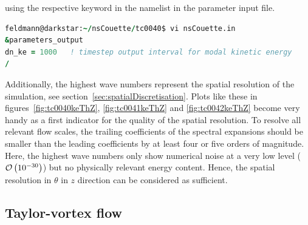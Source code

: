 \documentclass[a4paper, 11pt, DIV=11]{scrartcl}
\begin{document}
using the respective keyword in the namelist  in the parameter input file.
\begin{lstlisting}[language=fortran]
feldmann@darkstar:~/nsCouette/tc0040$ vi nsCouette.in
&parameters_output
dn_ke = 1000   ! timestep output interval for modal kinetic energy
/
\end{lstlisting}
Additionally, the highest wave numbers represent the spatial resolution
of the simulation, see section~\ref{sec:spatialDiscretisation}. Plots
like these in figures~\ref{fig:tc0040keThZ}, \ref{fig:tc0041keThZ} and
\ref{fig:tc0042keThZ} become very handy as a first indicator for the quality
of the spatial resolution. To
resolve all relevant flow scales, the trailing coefficients of the
spectral expansions should be smaller than the leading coefficients
by at least four or five orders of magnitude. Here, the highest wave
numbers only show numerical noise at a very low level
($\mathcal{O}\left(\num{e-30}\right)$) but no physically relevant energy
content. Hence, the spatial resolution in $\theta$ in $z$ direction can
be considered as sufficient.



\subsection{Taylor-vortex flow}
\label{sec:tc0041}
\end{document}
